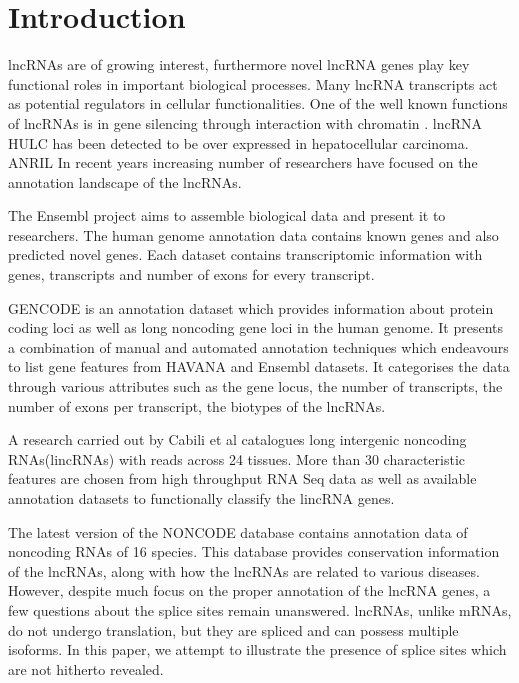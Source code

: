 \documentclass[ncrna,article,submit,moreauthors,pdftex,10pt,a4paper]{mdpi}
\begin{document}
\section{Introduction}

lncRNAs are of growing interest, furthermore novel lncRNA genes play key functional roles in important biological processes.
Many lncRNA transcripts act as potential regulators in cellular functionalities. One of the well known functions of lncRNAs is 
in gene silencing through interaction with chromatin \cite{guttmannat2012}. lncRNA HULC \cite{tay2014} has been detected to be over expressed in hepatocellular carcinoma. ANRIL 
In recent years increasing number of researchers have focused on the annotation landscape of the lncRNAs.

The Ensembl project \cite{flicek2014} aims to assemble biological data and present it to researchers. The human genome annotation data contains known genes
and also predicted novel genes. Each dataset contains transcriptomic information with genes, transcripts and number of exons for every transcript.

GENCODE\cite{harrow2012} is an annotation dataset which provides information about protein coding loci as well as long noncoding gene loci in the human genome. 
It presents a combination of manual and automated annotation techniques which endeavours to list gene features from HAVANA and Ensembl datasets.
It categorises the data through various attributes such as the gene locus, the number of transcripts, the number of exons per transcript, 
the biotypes of the lncRNAs.

A research carried out by Cabili et al \cite{cabili2011} catalogues long intergenic noncoding RNAs(lincRNAs) with reads across 24 tissues. More than 30 characteristic features 
are chosen from high throughput RNA Seq data as well as available annotation datasets to functionally classify the lincRNA genes.

The latest version of the NONCODE database \cite{zhao2016} contains annotation data of noncoding RNAs of 16 species. This database provides conservation 
information of the lncRNAs, along with how the lncRNAs are related to various diseases.\\

However, despite much focus on the proper annotation of the lncRNA genes, a few questions about the splice sites remain unanswered. lncRNAs, unlike mRNAs,
do not undergo translation, but they are spliced and can possess multiple isoforms. In this paper, we attempt to illustrate the presence of 
splice sites which are not hitherto revealed. 
\end{document}
